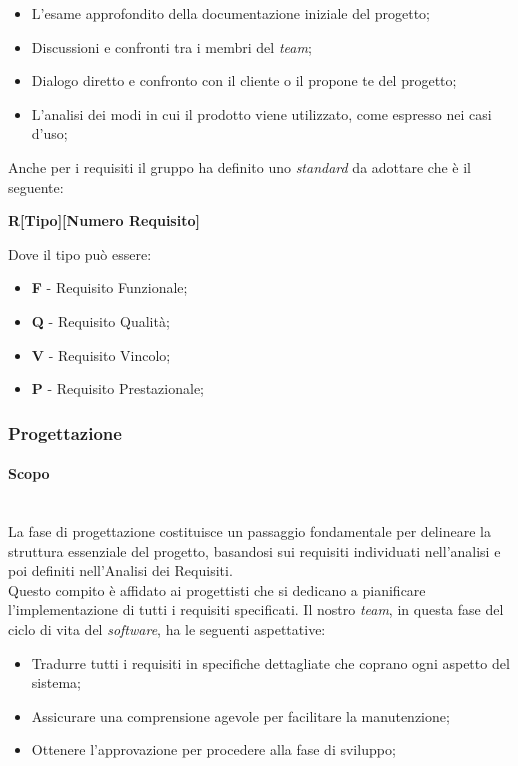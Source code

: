 \documentclass[5pt]{article}
\begin{document}
\begin{itemize}
    \item L'esame approfondito della documentazione iniziale del progetto;
    \item Discussioni e confronti tra i membri del \textit{team};
    \item Dialogo diretto e confronto con il cliente o il propone te del progetto;
    \item L'analisi dei modi in cui il prodotto viene utilizzato, come espresso nei casi d'uso;
\end{itemize}
Anche per i requisiti il gruppo ha definito uno \textit{standard} da adottare che è il seguente:
\begin{center}
    \textbf{R[Tipo][Numero Requisito]}
\end{center}
Dove il tipo può essere:
\begin{itemize}
    \item \textbf{F} - Requisito Funzionale;
    \item \textbf{Q} - Requisito Qualità;
    \item \textbf{V} - Requisito Vincolo;
    \item \textbf{P} - Requisito Prestazionale;
\end{itemize}
\subsubsection{Progettazione}

\paragraph{Scopo}~\\
La fase di progettazione costituisce un passaggio fondamentale per delineare la struttura essenziale del progetto, basandosi sui requisiti individuati nell'analisi e poi definiti nell'Analisi dei Requisiti. \\
Questo compito è affidato ai progettisti che si dedicano a pianificare l'implementazione di tutti i requisiti specificati. Il nostro \textit{team}, in questa fase del ciclo di vita del \textit{software}, ha le seguenti aspettative:
\begin{itemize}
    \item Tradurre tutti i requisiti in specifiche dettagliate che coprano ogni aspetto del sistema;
    \item Assicurare una comprensione agevole per facilitare la manutenzione;
    \item Ottenere l'approvazione per procedere alla fase di sviluppo;
\end{itemize}
\end{document}
